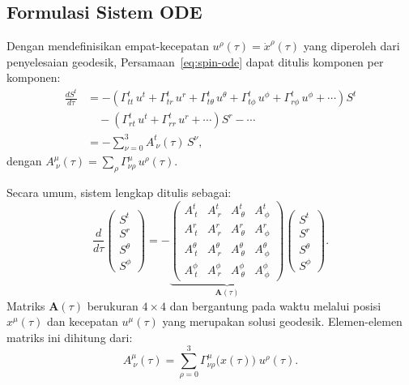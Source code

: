 \subsection{Formulasi Sistem ODE}
\label{subsec:spin-ode-system}

Dengan mendefinisikan empat-kecepatan $u^\rho(\tau) = \dot{x}^\rho(\tau)$
yang diperoleh dari penyelesaian geodesik,
Persamaan~\eqref{eq:spin-ode} dapat ditulis komponen per komponen:
\begin{equation}
\begin{aligned}
    \frac{dS^t}{d\tau}
    &= -\left(\Gamma^t_{tt}\, u^t + \Gamma^t_{tr}\, u^r
      + \Gamma^t_{t\theta}\, u^\theta + \Gamma^t_{t\phi}\, u^\phi
      + \Gamma^t_{r\phi}\, u^\phi + \cdots\right) S^t \\
    &\quad -\left(\Gamma^t_{rt}\, u^t + \Gamma^t_{rr}\, u^r + \cdots\right) S^r
     - \cdots \\[4pt]
    &= -\sum_{\nu=0}^{3} A^t_{\ \nu}(\tau)\, S^\nu,
\end{aligned}
    \label{eq:spin-t-component}
\end{equation}
dengan $A^\mu_{\ \nu}(\tau) = \sum_\rho \Gamma^\mu_{\nu\rho}\, u^\rho(\tau)$.

Secara umum, sistem lengkap ditulis sebagai:
\begin{equation}
    \frac{d}{d\tau}
    \begin{pmatrix} S^t \\ S^r \\ S^\theta \\ S^\phi \end{pmatrix}
    = -\underbrace{
    \begin{pmatrix}
        A^t_{\ t} & A^t_{\ r} & A^t_{\ \theta} & A^t_{\ \phi} \\
        A^r_{\ t} & A^r_{\ r} & A^r_{\ \theta} & A^r_{\ \phi} \\
        A^\theta_{\ t} & A^\theta_{\ r} & A^\theta_{\ \theta} & A^\theta_{\ \phi} \\
        A^\phi_{\ t} & A^\phi_{\ r} & A^\phi_{\ \theta} & A^\phi_{\ \phi}
    \end{pmatrix}
    }_{\displaystyle\mathbf{A}(\tau)}
    \begin{pmatrix} S^t \\ S^r \\ S^\theta \\ S^\phi \end{pmatrix}.
    \label{eq:spin-full-matrix}
\end{equation}
Matriks $\mathbf{A}(\tau)$ berukuran $4 \times 4$
dan bergantung pada waktu melalui posisi $x^\mu(\tau)$
dan kecepatan $u^\mu(\tau)$ yang merupakan solusi geodesik.
Elemen-elemen matriks ini dihitung dari:
\begin{equation}
    \boxed{A^\mu_{\ \nu}(\tau) = \sum_{\rho=0}^{3} \Gamma^\mu_{\nu\rho}\bigl(x(\tau)\bigr)\; u^\rho(\tau).}
    \label{eq:A-elements}
\end{equation}


